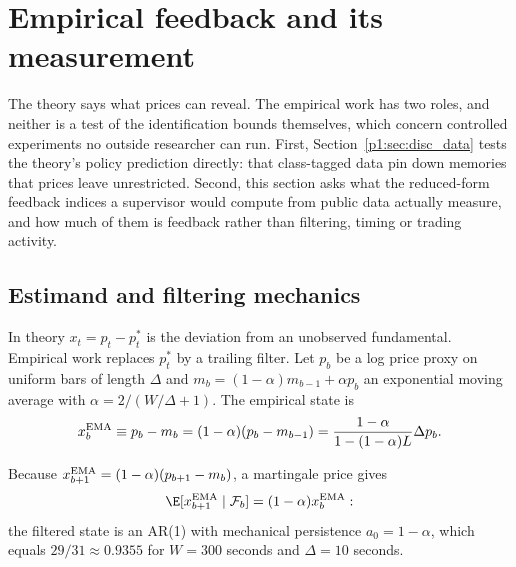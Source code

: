 \section{Empirical feedback and its measurement}\label{p1:sec:empirics}

The theory says what prices can reveal. The empirical work has two roles, and neither is a test of the identification bounds themselves, which concern controlled experiments no outside researcher can run. First, Section~\ref{p1:sec:disc_data} tests the theory's policy prediction directly: that class-tagged data pin down memories that prices leave unrestricted. Second, this section asks what the reduced-form feedback indices a supervisor would compute from public data actually measure, and how much of them is feedback rather than filtering, timing or trading activity.

\subsection{Estimand and filtering mechanics}

In theory $x_t=p_t-p^*_t$ is the deviation from an unobserved fundamental. Empirical work replaces $p^*_t$ by a trailing filter. Let $p_b$ be a log price proxy on uniform bars of length $\Delta$ and $m_b=(1-\alpha)m_{b-1}+\alpha p_b$ an exponential moving average with $\alpha=2/(W/\Delta+1)$. The empirical state is
\begin{equation}\label{p1:eq:ema}
x^{\rm EMA}_b\equiv p_b-m_b=(1-\alpha)(p_b-m_{b-1})=\frac{1-\alpha}{1-(1-\alpha)L}\Delta p_b .
\end{equation}

Because $x^{\rm EMA}_{b+1}=(1-\alpha)(p_{b+1}-m_b)$, a martingale price gives
\begin{equation}\label{p1:eq:mech}
\E[x^{\rm EMA}_{b+1}\mid\mathcal F_b]=(1-\alpha)x^{\rm EMA}_b :
\end{equation}
the filtered state is an AR(1) with mechanical persistence $a_0=1-\alpha$, which equals $29/31\approx0.9355$ for $W=300$ seconds and $\Delta=10$ seconds.


